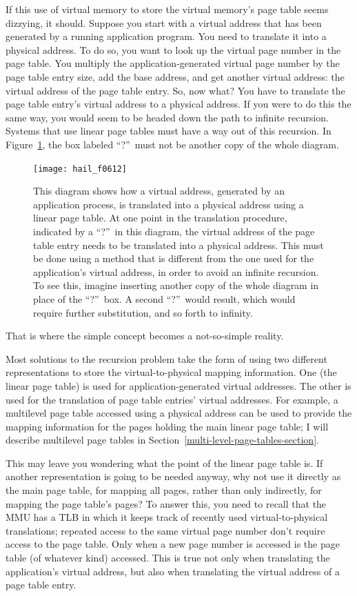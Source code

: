 If this use of virtual memory to store the virtual memory's page table
seems dizzying, it should.  Suppose you start with a virtual address
that has been generated by a running application program.  You need to
translate it into a physical address.  To do so, you want to look up
the virtual page number in the page table.  You multiply the
application-generated virtual page number by the page table entry
size, add the base address, and get another virtual address: the
virtual address of the page table entry.  So, now what?  You have to
translate the page table entry's virtual address to a physical address.
If you were to do this the same way, you would seem to be headed down
the path to infinite recursion.
Systems that use linear
page tables must have a way out of this recursion. In Figure~\ref{scan-6-7}, the
box labeled ``?''\ must not be another copy of the whole diagram.
\begin{figure}
\centerline{\texttt{[image: hail\_f0612]}}
\caption{This diagram shows how a virtual address, generated by an
  application process, is translated into a physical address using a
  linear page table.  At one point in the translation procedure,
  indicated by a ``?''\ in this diagram, the virtual address of the
  page table entry needs to be translated into a physical address.
  This must be done using a method that is different from the one used for the
  application's virtual address, in order to avoid an infinite
  recursion.  To see this, imagine inserting another copy of the whole diagram in
  place of the ``?''\ box.  A second ``?''\ would result, which would
  require further substitution, and so forth to infinity.}
\label{scan-6-7}
\end{figure}
That is where the
simple concept becomes a not-so-simple reality.

Most solutions to the recursion problem take the form
of using two different representations to store the
virtual-to-physical mapping information.  One (the linear page table)
is used for application-generated virtual addresses.  The other is
used for the translation of page table entries' virtual addresses.
For example, a multilevel page table accessed using a physical address can be used to provide the mapping information for the
pages holding the main linear page table; I will describe multilevel page
tables in Section~\ref{multi-level-page-tables-section}.

This may leave you wondering what the point of the linear page table
is.  If another representation is going to be needed anyway, why not
use it directly as the main page table, for mapping all pages, rather
than only indirectly, for mapping the page table's pages?  To answer
this, you need to recall that the MMU has a TLB in which it keeps track of
recently used virtual-to-physical translations; repeated access to the
same virtual page number don't require access to the page table.  Only
when a new page number is accessed is the page table (of whatever
kind) accessed.  This is true not only when translating the
application's virtual address, but also when translating the virtual
address of a page table entry.

